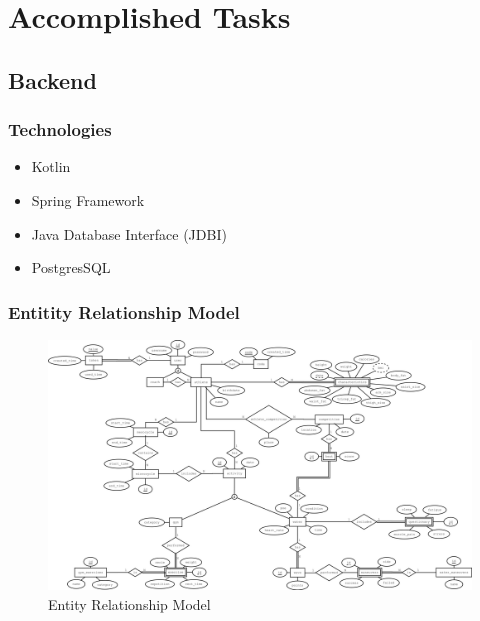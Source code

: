 \documentclass[a4paper,twoside,11pt]{article}
\begin{document}
\section{Accomplished Tasks}


\subsection{Backend}

\subsubsection{Technologies}
\begin{itemize}
\item Kotlin
\item Spring Framework
\item Java Database Interface (JDBI)
\item PostgresSQL
\end{itemize}

\subsubsection{Entitity Relationship Model}

\begin{figure}[H]
\centering
\includegraphics[width=6in]{EA.png}
\caption{Entity Relationship Model}
\end{figure}
\end{document}
